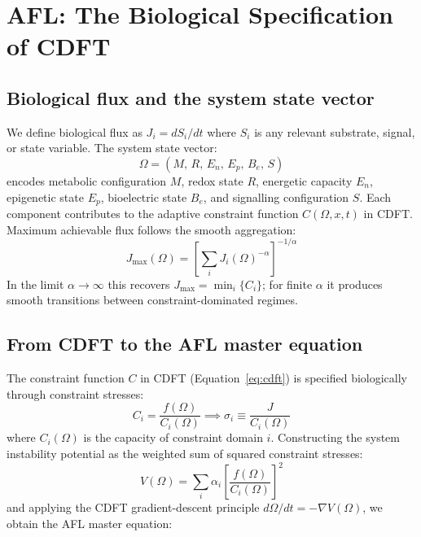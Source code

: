\documentclass[11pt]{article}
\newcommand{\Jmax}{J_{\max}}
\newcommand{\Om}{\Omega}
\begin{document}

\section{AFL: The Biological Specification of CDFT}
\subsection{Biological flux and the system state vector}

We define biological flux as $J_i = dS_i/dt$ where $S_i$ is any relevant substrate, signal, or state variable. The system state vector:
\begin{equation}
\Om = (M,\, R,\, E_n,\, E_p,\, B_e,\, S)
\label{eq:state}
\end{equation}
encodes metabolic configuration $M$, redox state $R$, energetic capacity $E_n$, epigenetic state $E_p$, bioelectric state $B_e$, and signalling configuration $S$. Each component contributes to the adaptive constraint function $C(\Om,x,t)$ in CDFT. Maximum achievable flux follows the smooth aggregation:
\begin{equation}
\Jmax(\Om) = \left[\sum_i J_i(\Om)^{-\alpha}\right]^{-1/\alpha}
\label{eq:jmax}
\end{equation}
In the limit $\alpha \to \infty$ this recovers $\Jmax = \min_i\{C_i\}$; for finite $\alpha$ it produces smooth transitions between constraint-dominated regimes.

\subsection{From CDFT to the AFL master equation}

The constraint function $C$ in CDFT (Equation~\ref{eq:cdft}) is specified biologically through constraint stresses:
\begin{equation}
C_i = \frac{f(\Om)}{C_i(\Om)} \implies \sigma_i \equiv \frac{J}{C_i(\Om)}
\label{eq:lambda_bio}
\end{equation}
where $C_i(\Om)$ is the capacity of constraint domain $i$. Constructing the system instability potential as the weighted sum of squared constraint stresses:
\begin{equation}
V(\Om) = \sum_i \alpha_i \left[\frac{f(\Om)}{C_i(\Om)}\right]^2
\label{eq:potential}
\end{equation}
and applying the CDFT gradient-descent principle $d\Om/dt = -\nabla V(\Om)$, we obtain the AFL master equation:
\end{document}
